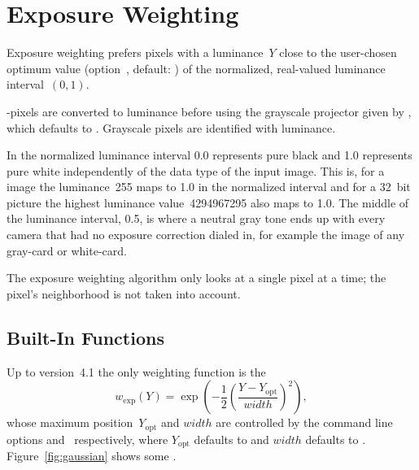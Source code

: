 

\section[Exposure Weighting]{Exposure Weighting
  \label{sec:exposure-weighting}
  }

Exposure weighting prefers pixels with a luminance~$Y$ close to the
user-chosen optimum value
(option~,
default: ) of the normalized,
real-valued luminance interval~$(0, 1)$.

-pixels are converted to luminance before using the
grayscale projector given by
, which defaults
to .  Grayscale pixels are identified with luminance.

In the normalized luminance interval 0.0 represents pure
black and 1.0 represents pure white independently of the data type of
the input image.  This is, for a  image the
luminance~255 maps to 1.0 in the normalized interval and for a 32~bit
 picture the highest luminance value~4294967295 also
maps to 1.0.  The middle of the luminance interval, 0.5, is where a
neutral gray tone ends up with every camera that had no exposure
correction dialed in, for example the image of any gray-card or
white-card.

The exposure weighting algorithm only looks at a single pixel at a
time; the pixel's neighborhood is not taken into account.


\subsection[Built-In Functions]{Built-In Functions
  \label{sec:built-in-functions}
  }

Up to \App{} version~4.1 the only weighting function is the
\[
    w_{\mathrm{exp}}(Y) =
    \exp\left(-\frac{1}{2}
              \left( \frac{Y - Y_{\mathrm{opt}}}{\mathit{width}} \right)^2\right),
\]
\noindent whose maximum position~$Y_{\mathrm{opt}}$ and $width$ are
controlled by the command line options 
and~ respectively, where $Y_{\mathrm{opt}}$
defaults to  and $width$ defaults to
.  Figure~\ref{fig:gaussian} shows
some .


